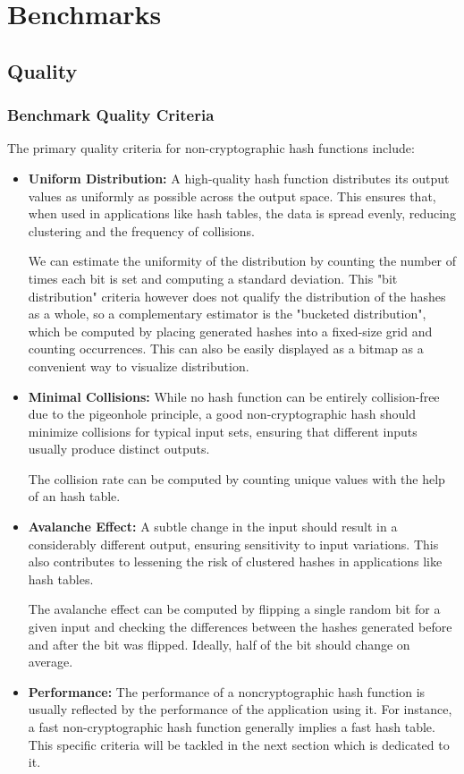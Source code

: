 \documentclass[10pt]{article}
\begin{document}
\clearpage
\section{Benchmarks}

\subsection{Quality}

\subsubsection{Benchmark Quality Criteria}
The primary quality criteria for non-cryptographic hash functions include:

\begin{itemize}
    \item \textbf{Uniform Distribution:} A high-quality hash function distributes its output values as uniformly as possible across the output space. This ensures that, when used in applications like hash tables, the data is spread evenly, reducing clustering and the frequency of collisions.

    We can estimate the uniformity of the distribution by counting the number of times each bit is set and computing a standard deviation. This "bit distribution" criteria however does not qualify the distribution of the hashes as a whole, so a complementary estimator is the "bucketed distribution", which be computed by placing generated hashes into a fixed-size grid and counting occurrences. This can also be easily displayed as a bitmap as a convenient way to visualize distribution.
    \item \textbf{Minimal Collisions:} While no hash function can be entirely collision-free due to the pigeonhole principle, a good non-cryptographic hash should minimize collisions for typical input sets, ensuring that different inputs usually produce distinct outputs.
    
    The collision rate can be computed by counting unique values with the help of an hash table.
    \item \textbf{Avalanche Effect:} A subtle change in the input should result in a considerably different output, ensuring sensitivity to input variations. This also contributes to lessening the risk of clustered hashes in applications like hash tables.
    
    The avalanche effect can be computed by flipping a single random bit for a given input and checking the differences between the hashes generated before and after the bit was flipped. Ideally, half of the bit should change on average.
    \item \textbf{Performance:} The performance of a noncryptographic hash function is usually reflected by the performance of the application using it. For instance, a fast non-cryptographic hash function generally implies a fast hash table. This specific criteria will be tackled in the next section which is dedicated to it. 

\end{itemize}
\end{document}
